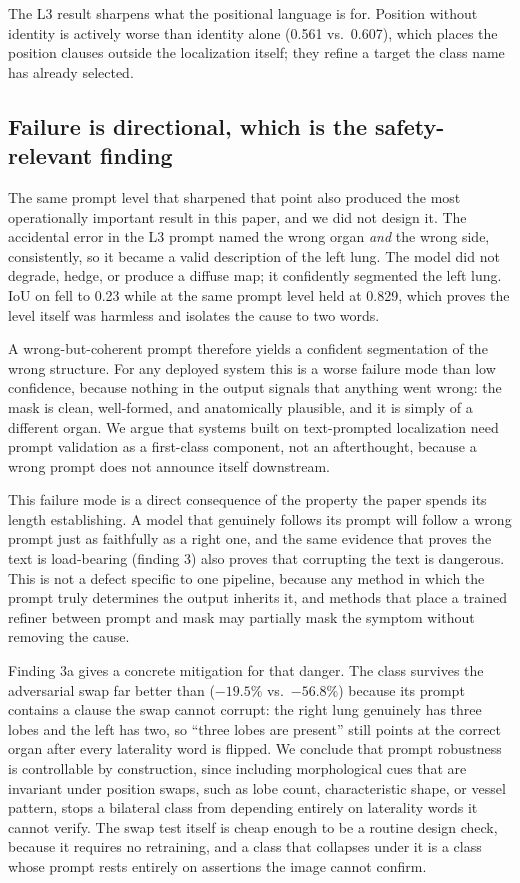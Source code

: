 The L3 result sharpens what the positional language is for. Position without
identity is actively worse than identity alone (0.561 vs.\ 0.607), which places
the position clauses outside the localization itself; they refine a target the
class name has already selected.

\subsection{Failure is directional, which is the safety-relevant finding}

The same prompt level that sharpened that point also produced the most
operationally important result in this paper, and we did not design it. The
accidental error in the L3  prompt named the wrong organ
\emph{and} the wrong
side, consistently, so it became a valid description of the left lung. The model
did not degrade, hedge, or produce a diffuse map; it confidently segmented the
left lung. IoU on  fell to 0.23 while  at the
same prompt level held at 0.829, which proves the level itself was harmless and
isolates the cause to two words.

A wrong-but-coherent prompt therefore yields a confident segmentation of the
wrong structure. For any deployed system this is a worse
failure mode than low confidence, because nothing in the output signals that
anything went wrong: the mask is clean, well-formed, and anatomically plausible,
and it is simply of a different organ. We argue that systems built on
text-prompted localization need prompt validation as a first-class component,
not an afterthought, because a wrong prompt does not announce itself downstream.

This failure mode is a direct consequence of the property the paper spends its
length establishing. A model that genuinely follows its prompt will follow a
wrong prompt just as faithfully as a right one, and the same evidence that
proves the text is load-bearing (finding 3) also proves that corrupting the text
is dangerous. This is not a defect specific to one pipeline, because any method
in which the prompt truly determines the output inherits it, and methods that
place a trained refiner between prompt and mask may partially mask the symptom
without removing the cause.

Finding 3a gives a concrete mitigation for that danger. The 
class survives the adversarial swap far better than 
($-19.5\%$ vs.\ $-56.8\%$) because its prompt contains a clause the swap cannot
corrupt: the
right lung genuinely has three lobes and the left has two, so ``three lobes are
present'' still points at the correct organ after every laterality word is
flipped. We conclude that prompt robustness is controllable by construction,
since including morphological cues that are invariant under position swaps, such
as lobe count, characteristic shape, or vessel pattern, stops a bilateral class
from depending entirely on laterality words it cannot verify. The swap test
itself is cheap enough to be a routine design check, because it requires no
retraining, and a class that collapses under it is a class whose prompt rests
entirely on assertions the image cannot confirm.

